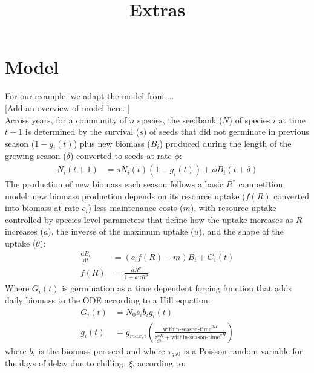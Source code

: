 \documentclass[11pt,letter]{article}
\begin{document}
\renewcommand{\refname}{\CHead{}}

\title{Extras} 

\renewcommand{\thetable}{S\arabic{table}}
\renewcommand{\thefigure}{S\arabic{figure}}

\section{Model} 
For our example, we adapt the model from ...  \\

[Add an overview of model here. ]\\

Across years, for a community of \(n\) species, the seedbank ($N$) of species $i$ at time $t+1$ is determined by the survival ($s$) of seeds that did not germinate in previous season ($1-g_{i}(t)$) plus new biomass ($B_i$) produced during the length of the growing season ($\delta$) converted to seeds at rate $\phi$:
\begin{align}
N_{i}(t+1) & =
s N_{i}(t)(1-g_{i}(t))+\phi B_{i}(t+\delta)
\end{align}
The production of new biomass each season follows a basic $R^{*}$ competition model: new biomass production depends on its resource uptake ($f(R)$ converted into biomass at rate $c_i$) less maintenance costs ($m$), with resource uptake controlled by species-level parameters that define how the uptake increases as $R$ increases ($a$), the inverse of the maximum uptake ($u$), and the shape of the uptake ($\theta$):
\begin{align}
\frac{\mathrm{d}B_i}{\mathrm{d}t} & = (c_{i}f(R) - m)B_{i} + G_{i}(t)\\ %
f(R) & = \frac{a R^{\theta}}{1+a uR^{\theta}}
\end{align}
Where $G_{i}(t)$ is germination as a time dependent forcing function that adds daily biomass to the ODE according to a Hill equation:
\begin{align}
G_{i}(t) & = N_{0}s_{i}b_{i}g_{i}(t)\\
g_{i}(t) & = g_{max,i}(\frac{\text{within-season-time}^{nH}}{\tau_{g50}^{nH} + \text{within-season-time}^{nH}})
\end{align}
where $b_{i}$ is the biomass per seed and where $\tau_{g50}$ is a Poisson random variable for the days of delay due to chilling, $\xi$, according to:   \\
\end{document}
